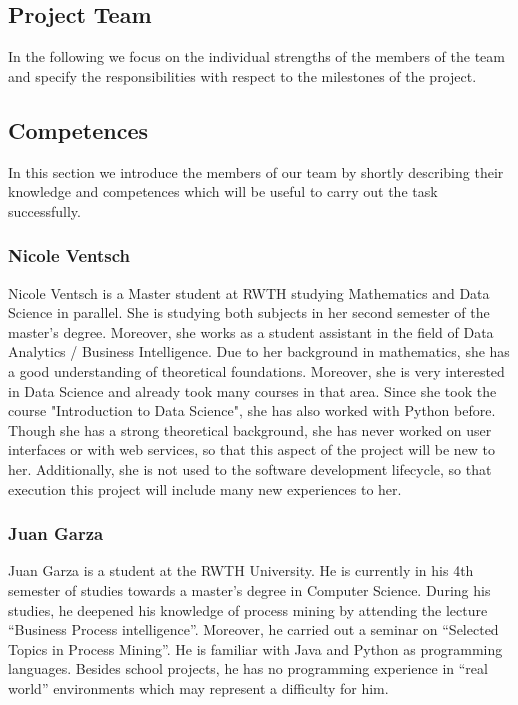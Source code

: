 \documentclass[notitlepage]{article}
\begin{document}
\begin{flushleft}
\section{Project Team}
In the following we focus on the individual strengths of the members of the team and specify the responsibilities with respect to the milestones of the project.

\subsection{Competences} 
In this section we introduce the members of our team by shortly describing their knowledge and competences which will be useful to carry out the task successfully.

\subsubsection*{Nicole Ventsch}

Nicole Ventsch is a Master student at RWTH studying Mathematics and Data Science in parallel. She is studying both subjects in her second semester of the master's degree. Moreover, she works as a student assistant in the field of Data Analytics / Business Intelligence. Due to her background in mathematics, she has a good understanding of theoretical foundations. Moreover, she is very interested in Data Science and already took many courses in that area. Since she took the course "Introduction to Data Science", she has also worked with Python before. Though she has a strong theoretical background, she has never worked on user interfaces or with web services, so that this aspect of the project will be new to her. Additionally, she is not used to the software development lifecycle, so that execution this project will include many new experiences to her. 

\subsubsection*{Juan Garza}

Juan Garza is a student at the RWTH University. He is currently in his 4th semester of studies towards a master’s degree in Computer Science. During his studies, he deepened his knowledge of process mining by attending the lecture “Business Process intelligence”. Moreover, he carried out a seminar on “Selected Topics in Process Mining”. He is familiar with Java and Python as programming languages. Besides school projects, he has no programming experience in “real world” environments which may represent a difficulty for him. 


\end{flushleft}
\end{document}
